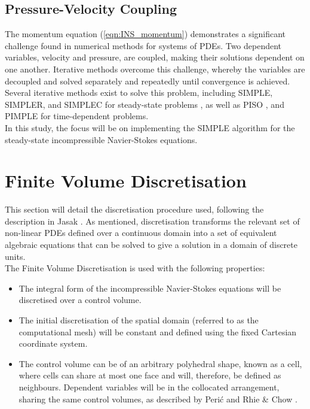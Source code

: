 \documentclass[final,3p,times,twocolumn]{elsarticle}
\begin{document}
\subsection{Pressure-Velocity Coupling}

The momentum equation (\ref{eqn:INS_momentum}) demonstrates a significant challenge found in numerical methods for systems of PDEs. Two dependent variables, velocity and pressure, are coupled, making their solutions dependent on one another. Iterative methods overcome this challenge, whereby the variables are decoupled and solved separately and repeatedly until convergence is achieved. Several iterative methods exist to solve this problem, including SIMPLE, SIMPLER, and SIMPLEC for steady-state problems \cite{Patankar1980NumericalFlow}, as well as PISO \cite{Issa1986SolutionOperator-splitting}, and PIMPLE \cite{OpenFOAMOpenFOAMWiki} for time-dependent problems. \\ In this study, the focus will be on implementing the SIMPLE algorithm for the steady-state incompressible Navier-Stokes equations. 

\section{Finite Volume Discretisation}
 This section will detail the discretisation procedure used, following the description in Jasak \cite{Jasak1996ErrorFlows}. As mentioned, discretisation transforms the relevant set of non-linear PDEs defined over a continuous domain into a set of equivalent algebraic equations that can be solved to give a solution in a domain of discrete units. \\ The Finite Volume Discretisation is used with the following properties: 
 \begin{itemize}
     \item The integral form of the incompressible Navier-Stokes equations will be discretised over a control volume.
     \item The initial discretisation of the spatial domain (referred to as the computational mesh) will be constant and defined using the fixed Cartesian coordinate system.
     \item The control volume can be of an arbitrary polyhedral shape, known as a cell, where cells can share at most one face and will, therefore, be defined as neighbours. Dependent variables will be in the collocated arrangement, sharing the same control volumes, as described by Peri\'c \cite{Peric1985ADucts.} and Rhie \& Chow \cite{Rhie1982NumericalSeparation}.
 \end{itemize}
\end{document}
